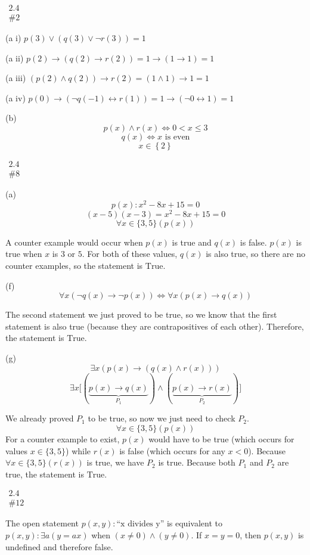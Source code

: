 \documentclass{article}
\newcommand{\T}{1}
\newcommand{\F}{0}
\newcommand{\problem}[2]{$\boxed{\begin{array}{l}\text{#1} \\ \text{\##2}\end{array}}$}
\newcommand{\subproblem}[1]{(#1)}
\begin{document}
\begin{multicols*}{2}

\problem{2.4}{2}

\subproblem{a i} $p(3)\vee(q(3)\vee\neg r(3)) = \boxed{\T}$

\subproblem{a ii} $p(2)\rightarrow(q(2)\rightarrow r(2)) = \T\rightarrow(\T\rightarrow\T) = \boxed{\T}$

\subproblem{a iii} $(p(2)\wedge q(2))\rightarrow r(2) = (\T\wedge\T)\rightarrow\T = \boxed{\T}$

\subproblem{a iv} $p(0)\rightarrow (\neg q(-1)\leftrightarrow r(1)) = \T\rightarrow(\neg \F\leftrightarrow\T) = \boxed{\T}$

\subproblem{b} \[
p(x)\wedge r(x) \Leftrightarrow 0 < x \le 3
\] \[
q(x)\Leftrightarrow \text{$x$ is even}
\] \[
\boxed{x\in\left\{2\right\}}
\]

%

\problem{2.4}{8}

\subproblem{a} \[
p(x): x^2-8x+15=0
\] \[
(x-5)(x-3)=x^2-8x+15=0
\] \[
\forall x\in\{3,5\}(p(x))
\]

A counter example would occur when $p(x)$ is true and $q(x)$ is
false. $p(x)$ is true when $x$ is $3$ or $5$. For both of these
values, $q(x)$ is also true, so there are no counter examples, so the
statement is $\boxed{\text{True}}$.

\subproblem{f} \[
\forall x(\neg q(x)\rightarrow\neg p(x)) \Leftrightarrow \forall x(p(x)\rightarrow q(x))
\]

The second statement we just proved to be true, so we know that the
first statement is also true (because they are contrapositives of each
other). Therefore, the statement is $\boxed{\text{True}}$.

\subproblem{g} \[
\exists x(p(x)\rightarrow (q(x)\wedge r(x)))
\] \[
\exists x\lbrack(\underbrace{p(x)\rightarrow q(x)}_{P_1})\wedge(\underbrace{p(x)\rightarrow r(x)}_{P_2})\rbrack
\]

We already proved $P_1$ to be true, so now we just need to check
$P_2$.
\[
\forall x\in\{3,5\}(p(x))
\]
For a counter example to exist, $p(x)$ would have to be true (which
occurs for values $x\in\{3,5\}$) while $r(x)$ is false (which occurs
for any $x<0$). Because $\forall x\in\{3,5\}(r(x))$ is true, we have
$P_2$ is true. Because both $P_1$ and $P_2$ are true, the statement is
$\boxed{\text{True}}$.

%

\problem{2.4}{12}

The open statement $p(x,y): \text{``x divides y''}$ is equivalent to
$p(x,y):\exists a(y=ax)$ when $(x\ne 0)\wedge(y\ne 0)$. If $x=y=0$,
then $p(x,y)$ is undefined and therefore false.


\end{multicols*}
\end{document}
